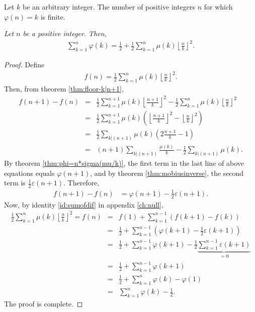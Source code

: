 \documentclass[12pt]{subfile}
\begin{document}
		\begin{corollary}
			Let $k$ be an arbitrary integer. The number of positive integers $n$ for which $\varphi(n) = k$ is finite.
		\end{corollary}

		\begin{theorem}\slshape
			Let $n$ be a positive integer. Then,
				\begin{align*}
					\sum_{k=1}^{n} \varphi(k) = \frac{1}{2} + \frac{1}{2}\sum_{k=1}^{n} \mu(k) \left\lfloor \frac{n}{k} \right\rfloor^2.
				\end{align*}
		\end{theorem}
		
		\begin{proof}
			Define
				\begin{align*}
					f(n) = \frac{1}{2}\sum_{k=1}^{n} \mu(k) \left\lfloor \frac{n}{k} \right\rfloor^2.
				\end{align*}
			Then, from theorem \eqref{thm:floor-k|n+1},
				\begin{eqnarray*}
					f(n+1)-f(n) &=& \frac{1}{2}\sum_{k=1}^{n+1} \mu(k) \left\lfloor \frac{n+1}{k} \right\rfloor^2 - \frac{1}{2}\sum_{k=1}^{n} \mu(k) \left\lfloor \frac{n}{k} \right\rfloor^2\\
								&=& \frac{1}{2}\sum_{k=1}^{n+1} \mu(k) \left(\left\lfloor \frac{n+1}{k} \right\rfloor^2 - \left\lfloor \frac{n}{k} \right\rfloor^2\right)\\
								&=& \frac{1}{2}\sum_{k|(n+1)}\mu(k) \left(2 \frac{n+1}{k}-1\right)\\
								&=& (n+1)\sum_{k|(n+1)} \frac{\mu(k)}{k} - \frac{1}{2} \sum_{k|(n+1)} \mu(k).
				\end{eqnarray*}
			By theorem \eqref{thm:phi=n*sigma(mu/k)}, the first term in the last line of above equations equals $\varphi(n+1)$, and by theorem \eqref{thm:mobiusinverse}, the second term is $\frac{1}{2} \varepsilon(n+1)$. Therefore,
				\begin{align*}
					f(n+1)-f(n) &= \varphi(n+1) - \frac{1}{2}\varepsilon(n+1).
				\end{align*}
			Now, by identity \eqref{id:sumofdif} in appendix \eqref{ch:null},
				\begin{eqnarray*}
					\frac{1}{2}\sum_{k=1}^{n} \mu(k) \left\lfloor \frac{n}{k} \right\rfloor^2 = f(n) 
						&=& f(1) + \sum_{k=1}^{n-1} \left(f(k+1)-f(k)\right)\\
						&=& \frac{1}{2} + \sum_{k=1}^{n-1} \left(\varphi(k+1) - \frac{1}{2}\varepsilon(k+1)\right)\\
						&=& \frac{1}{2} + \sum_{k=1}^{n-1} \varphi(k+1) - \frac{1}{2} \underbrace{\sum_{k=1}^{n-1} \varepsilon(k+1)}_{=0}\\
						&=& \frac{1}{2} + \sum_{k=1}^{n-1} \varphi(k+1)\\
						&=& \frac{1}{2} + \sum_{k=1}^{n} \varphi(k) - \varphi(1)\\
						&=& \sum_{k=1}^{n} \varphi(k) - \frac{1}{2}.
				\end{eqnarray*}
			The proof is complete.
		\end{proof}
		
\end{document}
